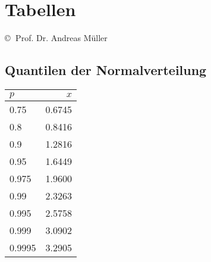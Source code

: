 \renewcommand{\arraystretch}{1}
\section{Tabellen}
\copyright$\;$ Prof. Dr. Andreas Müller
\subsection{Quantilen der Normalverteilung}
	\label{tabelle-quantilen-normalverteilung}
	\begin{minipage}{\textwidth}
    	\centering
\begin{tabular}{|l|r|}
\hline
$p$&$x$\\
\hline
\rowcolor[gray]{.9}
0.75&0.6745\\
0.8&0.8416\\
\rowcolor[gray]{.9}
0.9&1.2816\\
0.95&1.6449\\
\rowcolor[gray]{.9}
0.975&1.9600\\
0.99&2.3263\\
\rowcolor[gray]{.9}
0.995&2.5758\\
0.999&3.0902\\
\rowcolor[gray]{.9}
0.9995&3.2905\\
\hline
\end{tabular}
    \end{minipage}

